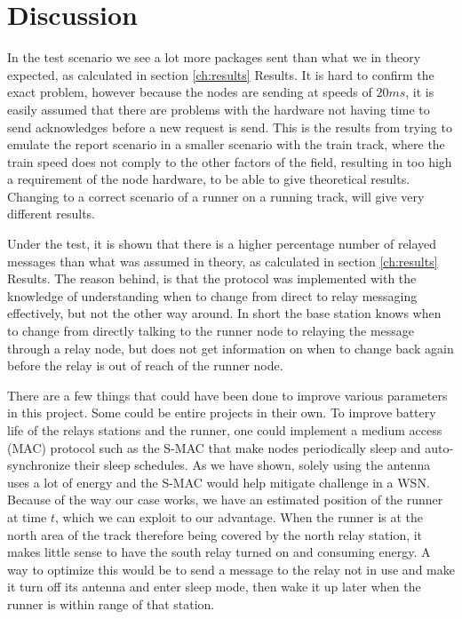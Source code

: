 \section{Discussion}
\noindent In the test scenario we see a lot more packages sent than what we in theory expected, as calculated in section \ref{ch:results} Results. It is hard to confirm the exact problem, however because the nodes are sending at speeds of $20ms$, it is easily assumed that there are problems with the hardware not having time to send acknowledges before a new request is send. This is the results from trying to emulate the report scenario in a smaller scenario with the train track, where the train speed does not comply to the other factors of the field, resulting in too high a requirement of the node hardware, to be able to give theoretical results. Changing to a correct scenario of a runner on a running track, will give very different results.

\noindent Under the test, it is shown that there is a higher percentage number of relayed messages than what was assumed in theory, as calculated in section \ref{ch:results} Results. The reason behind, is that the protocol was implemented with the knowledge of understanding when to change from direct to relay messaging effectively, but not the other way around. In short the base station knows when to change from directly talking to the runner node to relaying the message through a relay node, but does not get information on when to change back again before the relay is out of reach of the runner node. 

There are a few things that could have been done to improve various parameters in this project. Some could be entire projects in their own. To improve battery life of the relays stations and the runner, one could implement a medium access (MAC) protocol such as the S-MAC that make nodes periodically sleep and auto-synchronize their sleep schedules. As we have shown, solely using the antenna uses a lot of energy and the S-MAC would help mitigate challenge in a WSN. Because of the way our case works, we have an estimated position of the runner at time $t$, which we can exploit to our advantage. When the runner is at the north area of the track therefore being covered by the north relay station, it makes little sense to have the south relay turned on and consuming energy. A way to optimize this would be to send a message to the relay not in use and make it turn off its antenna and enter sleep mode, then wake it up later when the runner is within range of that station.

